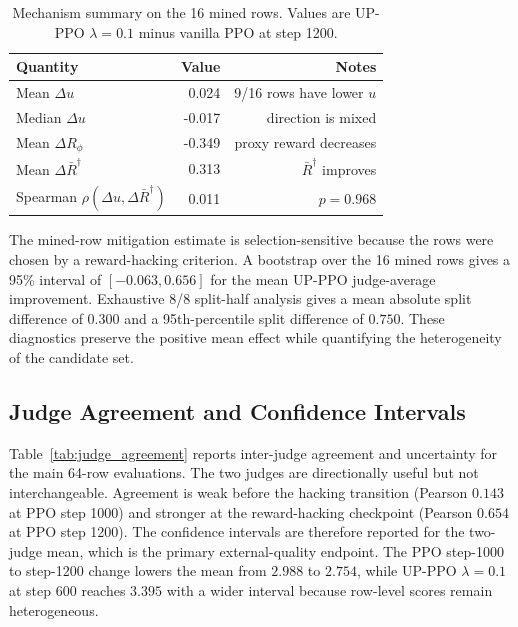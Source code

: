 \documentclass[twocolumn,10pt]{article}
\newcommand{\Rphi}{R_{\phi}}
\begin{document}
\begin{table}[!tbp]
\centering
\scriptsize
\caption{Mechanism summary on the 16 mined rows. Values are UP-PPO $\lambda=0.1$ minus vanilla PPO at step 1200.}
\label{tab:up_mechanism}
\begin{tabular}{lrr}
\toprule
Quantity & Value & Notes \\
\midrule
Mean $\Delta u$ & 0.024 & 9/16 rows have lower $u$ \\
Median $\Delta u$ & -0.017 & direction is mixed \\
Mean $\Delta\Rphi$ & -0.349 & proxy reward decreases \\
Mean $\Delta\bar R^\dagger$ & 0.313 & $\bar R^\dagger$ improves \\
Spearman $\rho(\Delta u,\Delta\bar R^\dagger)$ & 0.011 & $p=0.968$ \\
\bottomrule
\end{tabular}
\end{table}

The mined-row mitigation estimate is selection-sensitive because the rows were chosen by a reward-hacking criterion. A bootstrap over the 16 mined rows gives a 95\% interval of $[-0.063,0.656]$ for the mean UP-PPO judge-average improvement. Exhaustive 8/8 split-half analysis gives a mean absolute split difference of $0.300$ and a 95th-percentile split difference of $0.750$. These diagnostics preserve the positive mean effect while quantifying the heterogeneity of the candidate set.

\subsection{Judge Agreement and Confidence Intervals}
Table~\ref{tab:judge_agreement} reports inter-judge agreement and uncertainty for the main 64-row evaluations. The two judges are directionally useful but not interchangeable. Agreement is weak before the hacking transition (Pearson $0.143$ at PPO step 1000) and stronger at the reward-hacking checkpoint (Pearson $0.654$ at PPO step 1200). The confidence intervals are therefore reported for the two-judge mean, which is the primary external-quality endpoint. The PPO step-1000 to step-1200 change lowers the mean from $2.988$ to $2.754$, while UP-PPO $\lambda=0.1$ at step 600 reaches $3.395$ with a wider interval because row-level scores remain heterogeneous.
\end{document}
